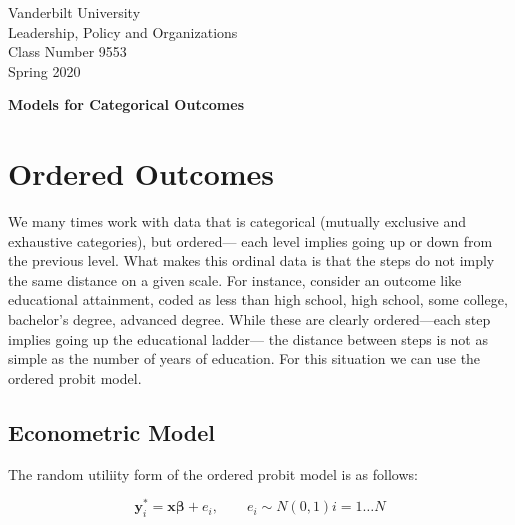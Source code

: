 \documentclass[12 pt]{article}
\begin{document}
\newcommand{\boldbeta}{\boldsymbol{\beta}}
\newcommand{\boldy}{\boldsymbol{y}}
\newcommand{\boldX}{\boldsymbol{X}}
\newcommand{\boldx}{\boldsymbol{x}}
\newcommand{\boldz}{\boldsymbol{z}}
\newcommand{\boldgamma}{\boldsymbol{\gamma}}
\newcommand{\boldeps}{\boldsymbol{\epsilon}}


\setlength{\parskip}{1ex plus 0.5ex minus 0.2ex}

\setcounter{secnumdepth}{-2}


\begin{flushleft}
  

Vanderbilt University \\
Leadership, Policy and Organizations \\
Class Number 9553 \\
Spring 2020 \\
\end{flushleft}

\begin{centering}
\textbf{\large{Models for Categorical Outcomes}}  
\end{centering}


\section{Ordered Outcomes}

We many times work with data that is categorical (mutually exclusive and exhaustive
categories), but ordered--- each level implies going up or down from the previous level.
What makes this ordinal data is that the steps do not imply the same distance on a
given scale. For instance, consider an outcome like educational attainment, coded as
less than high school, high school, some college, bachelor's degree, advanced degree.
While these are clearly ordered---each step implies going up the educational ladder---
the distance between steps is not as simple as the number of years of education.
For this situation we can use the ordered probit model. 


\subsection{Econometric Model}
\label{sec:econometric-model}

The random  utiliity form of the ordered probit model is as follows:

\begin{equation*}
  \boldy^*_i=\boldx \boldbeta + e_i, \qquad e_i  \sim N (0,1)   i=1  \ldots N
\end{equation*}
\end{document}
